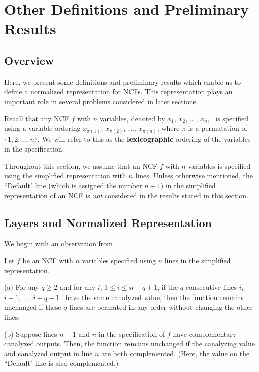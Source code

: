 \section{Other Definitions and Preliminary Results}
\label{sec:prelim}

\subsection{Overview}

Here, we present some definitions and preliminary results which enable
us to define a normalized representation for NCFs.
This representation plays an important role in several
problems considered in later sections.

\medskip

Recall that any NCF $f$ with $n$ variables,
denoted by $x_1$, $x_2$, $\ldots$, $x_n$,~
is specified using a variable ordering 
$x_{\pi(1)}$, $x_{\pi(2)}$, $\ldots$,  $x_{\pi(n)}$,
where $\pi$ is a permutation of $\{1, 2, \ldots, n\}$.
We will refer to this as the \textbf{lexicographic} ordering
of the variables in the specification.

\medskip

Throughout this section, we assume that an NCF $f$ with $n$
variables is specified using the simplified representation with $n$ lines. 
Unless otherwise mentioned, the ``Default" line (which is assigned the number $n+1$)
in the simplified representation of an NCF is \emph{not} considered
in the results stated in this section.

\subsection{Layers and Normalized Representation}
\label{sse:ncf_layer}

We begin with an observation from \cite{Stearns-etal-2018}.

\begin{observation} \label{obs:ncf_transformations}
Let $f$ be an NCF with $n$ variables specified using $n$ lines
in the simplified representation. 
\begin{description}
\item{(a)} 
For any $q \geq 2$ and for any $i$, $1 \leq i \leq n-q+1$,
if the $q$ consecutive lines $i$, $i+1$, $\ldots$, $i+q-1$~
have the same canalyzed value, then the function remains
unchanged if these $q$ lines are permuted in any order
without changing the other lines.

\item{(b)} 
Suppose lines $n-1$ and $n$ in the specification of $f$ 
have complementary canalyzed outputs.
Then, the function remains unchanged 
if the canalyzing value and canalyzed output in line $n$
are both complemented. 
(Here, the value on the ``Default" line is also complemented.)
\QED
\end{description}
\end{observation}

